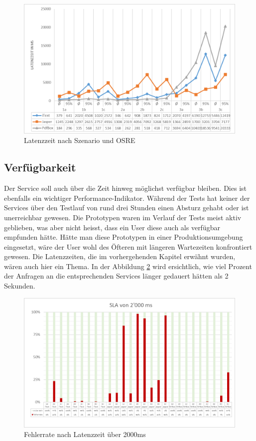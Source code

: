 \documentclass[main.tex]{subfiles}
\begin{document}
\begin{figure}[!h]
\includegraphics[width=\textwidth]{mainpart/4_analyse_img/LatenzzeitSzen.png}
 \caption{Latenzzeit nach Szenario und OSRE}
 \label{figure:latencySzenario}
\end{figure}

\subsection{Verfügbarkeit}

Der Service soll auch über die Zeit hinweg möglichst verfügbar bleiben. Dies ist ebenfalls ein wichtiger Performance-Indikator. Während der Tests hat keiner der Services über den Testlauf von rund drei Stunden einen Absturz gehabt oder ist unerreichbar gewesen. Die Prototypen waren im Verlauf der Tests meist aktiv geblieben, was aber nicht heisst, dass ein User diese auch als verfügbar empfunden hätte. Hätte man diese Prototypen in einer Produktionsumgebung eingesetzt, wäre der User wohl des Öfteren mit längeren Wartezeiten konfrontiert gewesen. 
Die Latenzzeiten, die im vorhergehenden Kapitel erwähnt wurden, wären auch hier ein Thema. In der Abbildung \ref{figure:latencySLA2000} wird ersichtlich, wie viel Prozent der Anfragen an die entsprechenden Services länger gedauert hätten als 2 Sekunden.

\begin{figure}[!h]
\includegraphics[width=\textwidth]{mainpart/4_analyse_img/latencySLA2000.png}
 \caption{Fehlerrate nach Latenzzeit über 2000ms}
 \label{figure:latencySLA2000}
\end{figure}
\end{document}
